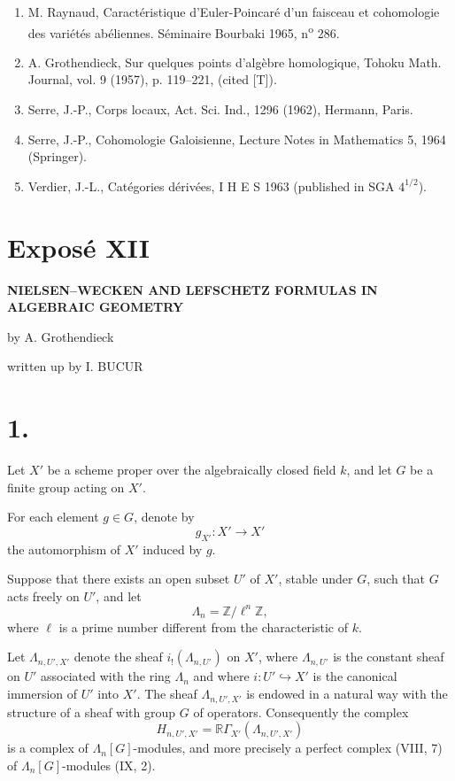 \documentclass[11pt]{article}
\providecommand{\La}{\Lambda}
\providecommand{\bZ}{\mathbb Z}
\begin{document}
\begin{enumerate}
\item[{[1]}] M. Raynaud, Caractéristique d'Euler-Poincaré d'un faisceau et cohomologie des variétés abéliennes. Séminaire Bourbaki 1965, n\textsuperscript{o} 286.
\item[{[2]}] A. Grothendieck, Sur quelques points d'algèbre homologique, Tohoku Math. Journal, vol. 9 (1957), p. 119--221, (cited [T]).
\item[{[3]}] Serre, J.-P., Corps locaux, Act. Sci. Ind., 1296 (1962), Hermann, Paris.
\item[{[4]}] Serre, J.-P., Cohomologie Galoisienne, Lecture Notes in Mathematics 5, 1964 (Springer).
\item[{[5]}] Verdier, J.-L., Catégories dérivées, I H E S 1963 (published in SGA $4^{1/2}$).
\end{enumerate}


\section*{Exposé XII}

\begin{center}
\Large\bfseries NIELSEN--WECKEN AND LEFSCHETZ FORMULAS IN ALGEBRAIC GEOMETRY
\end{center}

\begin{center}
by A. Grothendieck

written up by I. BUCUR
\end{center}

\bigskip

\section*{1.}
Let $X'$ be a scheme proper over the algebraically closed field $k$, and let $G$ be a finite group acting on $X'$.

For each element $g\in G$, denote by
\[
g_{X'}:X'\to X'
\]
the automorphism of $X'$ induced by $g$.

Suppose that there exists an open subset $U'$ of $X'$, stable under $G$, such that $G$ acts freely on $U'$, and let
\[
\La_n=\bZ/\ell^n\bZ,
\]
where $\ell$ is a prime number different from the characteristic of $k$.

Let $\La_{n,U',X'}$ denote the sheaf $i_!(\La_{n,U'})$ on $X'$, where $\La_{n,U'}$ is the constant sheaf on $U'$ associated with the ring $\La_n$ and where $i:U'\hookrightarrow X'$ is the canonical immersion of $U'$ into $X'$. The sheaf $\La_{n,U',X'}$ is endowed in a natural way with the structure of a sheaf with group $G$ of operators. Consequently the complex
\[
H_{n,U',X'}=\mathbb{R}\Gamma_{X'}(\La_{n,U',X'})
\]
is a complex of $\La_n[G]$-modules, and more precisely a perfect complex (VIII, 7) of $\La_n[G]$-modules (IX, 2).
\end{document}
